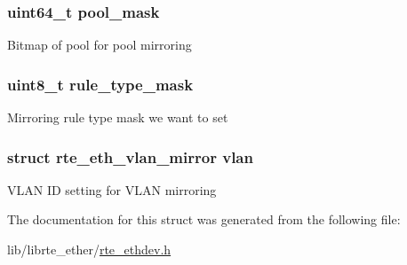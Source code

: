 \subsubsection[{pool\+\_\+mask}]{\setlength{\rightskip}{0pt plus 5cm}uint64\+\_\+t pool\+\_\+mask}\label{structrte__eth__vmdq__mirror__conf_a0133281e4371f5407722d87924bd0059}
Bitmap of pool for pool mirroring \hypertarget{structrte__eth__vmdq__mirror__conf_a83a5601a886010764654d3b6f8a24a7b}{}
\subsubsection[{rule\+\_\+type\+\_\+mask}]{\setlength{\rightskip}{0pt plus 5cm}uint8\+\_\+t rule\+\_\+type\+\_\+mask}\label{structrte__eth__vmdq__mirror__conf_a83a5601a886010764654d3b6f8a24a7b}
Mirroring rule type mask we want to set \hypertarget{structrte__eth__vmdq__mirror__conf_aa74cbc3329978599b6eed8e89a7f151b}{}
\subsubsection[{vlan}]{\setlength{\rightskip}{0pt plus 5cm}struct {\bf rte\+\_\+eth\+\_\+vlan\+\_\+mirror} vlan}\label{structrte__eth__vmdq__mirror__conf_aa74cbc3329978599b6eed8e89a7f151b}
V\+L\+A\+N I\+D setting for V\+L\+A\+N mirroring 

The documentation for this struct was generated from the following file\+:\begin{DoxyCompactItemize}
\item 
lib/librte\+\_\+ether/\hyperlink{rte__ethdev_8h}{rte\+\_\+ethdev.\+h}\end{DoxyCompactItemize}
